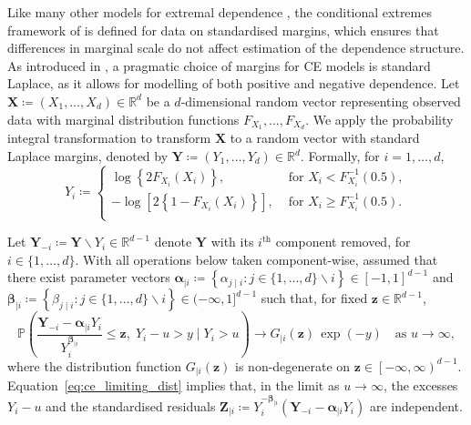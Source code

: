 \documentclass[preprint,12pt,authoryear]{elsarticle}
\begin{document}
Like many other models for extremal dependence \citep[see, e.g.,][]{Davison2015}, the conditional extremes framework of \citet{Heffernan2004} is defined for data on standardised margins, which ensures that differences in marginal scale do not affect estimation of the dependence structure.
As introduced in \citet{Keef2013}, a pragmatic choice of margins for CE models is standard Laplace, as it allows for modelling of both positive and negative dependence.
Let $\boldsymbol{X} \coloneqq (X_1, \ldots, X_d) \in \mathbb{R}^d$ be a $d$-dimensional random vector representing observed data with marginal distribution functions $F_{X_1}, \ldots, F_{X_d}$.
We apply the probability integral transformation to transform $\boldsymbol{X}$ to a random vector with standard Laplace margins, denoted by $\boldsymbol{Y} \coloneqq (Y_1, \ldots, Y_d) \in \mathbb{R}^d$.
Formally, for $i = 1, \ldots, d$, 
\begin{equation}\label{eq:laplace}
  Y_i \coloneqq \begin{cases}
    \log\left\{2F_{X_i}(X_i)\right\}, &\text{ for } X_i < F_{X_i}^{-1}(0.5), \\
    -\log\left[2\left\{ 1 - F_{X_i}(X_i)\right\} \right], &\text{ for } X_i \ge F_{X_i}^{-1}(0.5). \\
  \end{cases}
\end{equation}

Let $\boldsymbol{Y}_{-i} \coloneq \boldsymbol{Y} \backslash Y_i \in \mathbb{R}^{d-1}$ denote $\boldsymbol{Y}$ with its $i^{\text{th}}$ component removed, for $i \in \{1, \ldots, d\}$.
With all operations below taken component-wise, \citet{Heffernan2004} assumed that there exist parameter vectors $\boldsymbol{\alpha}_{\mid i} \coloneqq \left\{\alpha_{j \mid i} : j\in\{1,\dots,d\}\backslash i \right\} \in [-1, 1]^{d-1}$ and $\boldsymbol{\beta}_{\mid i} \coloneqq \left\{\beta_{j \mid i} : j\in\{1,\dots,d\}\backslash i \right\} \in (-\infty, 1]^{d-1}$ such that, for fixed $\boldsymbol{z} \in \mathbb{R}^{d-1}$,
\begin{equation}\label{eq:ce_limiting_dist}
  \mathbb{P}\!\left(
  \frac{\boldsymbol{Y}_{-i} - \boldsymbol{\alpha}_{\mid i} Y_{i}}
  {Y_{i}^{\boldsymbol{\beta}_{\mid i}}}
  \le \boldsymbol{z},\; 
  Y_i - u > y \;\Big|\; Y_i > u
  \right)
  \longrightarrow
  G_{\mid i}(\boldsymbol{z})\,\exp{(-y)}
  \quad\text{as } u \to \infty,
\end{equation}
where the distribution function $G_{\mid i}\left(\boldsymbol{z}\right)$ is non-degenerate on $\boldsymbol{z} \in \left[ -\infty, \infty \right)^{d-1}$.
Equation~\eqref{eq:ce_limiting_dist} implies that, in the limit as $u\to\infty$, the excesses $Y_i-u$ and the standardised residuals 
$\boldsymbol{Z}_{\mid i} \coloneqq Y_i^{-\boldsymbol{\beta}_{\mid i}}\left(\boldsymbol{Y}_{-i} - \boldsymbol{\alpha}_{\mid i} Y_{i}\right)$ are independent.
\end{document}
